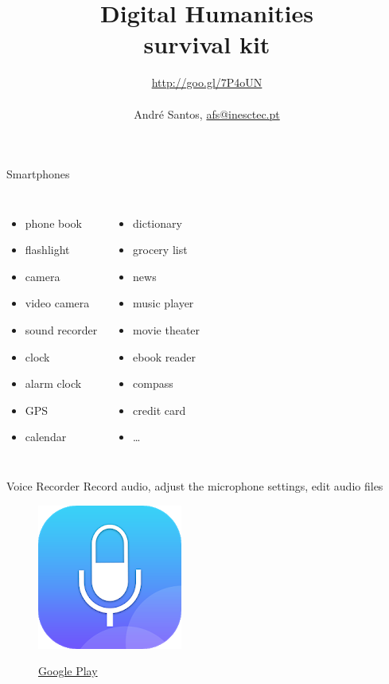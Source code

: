 \documentclass[serif,14pt,color=usenames,dvipsnames]{beamer}
\title{{\Large Digital Humanities}\\survival kit}
\author{\url{http://goo.gl/7P4oUN}\\
~\\
André Santos, \href{mailto:afs@inesctec.pt}{afs@inesctec.pt}
}
\begin{document}
\begin{frame}
\maketitle
\end{frame}






\begin{frame}{Smartphones}
  \begin{columns}
    \begin{itemize}
      \item phone book
      \item flashlight
      \item camera
      \item video camera
      \item sound recorder
      \item clock
      \item alarm clock
      \item GPS
      \item calendar
    \end{itemize}
    \begin{itemize}
      \item dictionary
      \item grocery list
      \item news
      \item music player
      \item movie theater
      \item ebook reader
      \item compass
      \item credit card
      \item \dots
    \end{itemize}
  \end{columns}
\end{frame}

\begin{frame}{Voice Recorder}
 Record audio, adjust the microphone settings, edit audio files

  \begin{figure}
    \centering
    \includegraphics[width=0.25\linewidth]{imgs/vr}

    \href{https://play.google.com/store/apps/details?id=vr.audio.voicerecorderpro}{Google
Play }
  \end{figure}

\end{frame}
\end{document}
